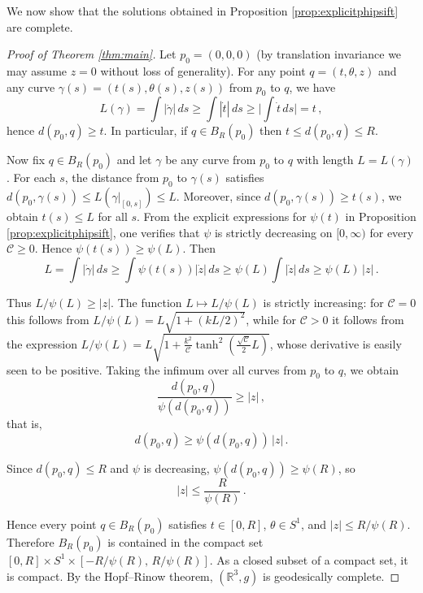 \documentclass[12pt,a4paper,reqno]{amsart}
\theoremstyle{plain}
\theoremstyle{remark}
\numberwithin{equation}{section}
\newcommand{\cC}{\mathcal{C}}
\newcommand{\R}{\mathbb{R}}
\begin{document}
We now show that the solutions obtained in Proposition \ref{prop:explicitphipsift} are complete.

\begin{proof}[Proof of Theorem \ref{thm:main}]
Let $p_0 = (0,0,0)$ (by translation invariance we may assume $z=0$ without loss of generality). For any point $q = (t,\theta,z)$ and any curve $\gamma(s) = (t(s),\theta(s),z(s))$ from $p_0$ to $q$, we have
\begin{equation*}
L(\gamma) = \int |\dot\gamma| \, ds \ge \int |\dot t| \, ds \ge \Big|\int \dot t \, ds\Big| = t \,,
\end{equation*}
hence $d(p_0,q) \ge t$. In particular, if $q \in B_R(p_0)$ then $t \le d(p_0,q) \le R$.

Now fix $q \in B_R(p_0)$ and let $\gamma$ be any curve from $p_0$ to $q$ with length $L = L(\gamma)$. 
For each $s$, the distance from $p_0$ to $\gamma(s)$ satisfies $d(p_0,\gamma(s)) \le L(\gamma|_{[0,s]}) \le L$. 
Moreover, since $d(p_0,\gamma(s)) \ge t(s)$, we obtain $t(s) \le L$ for all $s$. From the explicit expressions for $\psi(t)$ in Proposition \ref{prop:explicitphipsift}, one verifies that $\psi$ is strictly decreasing on $[0,\infty)$ for every $\cC\ge 0$. Hence $\psi(t(s)) \ge \psi(L)$. Then
\begin{equation*}
L = \int |\dot{\gamma}| \,ds \ge \int \psi(t(s))|\dot{z}| \,ds \ge \psi(L) \int |\dot{z}| \,ds \ge \psi(L) \,|z| \,.
\end{equation*}

Thus $L/\psi(L) \ge |z|$. The function $L \mapsto L/\psi(L)$ is strictly increasing: for $\cC=0$ this follows from $L/\psi(L)=L\sqrt{1+(kL/2)^2}$, while for $\cC>0$ it follows from the expression $L/\psi(L)=L\sqrt{1+\frac{k^2}{\cC}\tanh^2(\frac{\sqrt{\cC}}{2}L)}$, whose derivative is easily seen to be positive. Taking the infimum over all curves from $p_0$ to $q$, we obtain
\begin{equation*}
\frac{d(p_0,q)}{\psi(d(p_0,q))} \ge |z| \,,
\end{equation*}
that is,
\begin{equation*}
d(p_0,q) \ge \psi(d(p_0,q)) \,|z| \,.
\end{equation*}

Since $d(p_0,q) \le R$ and $\psi$ is decreasing, $\psi(d(p_0,q)) \ge \psi(R)$, so
\begin{equation*}
|z| \le \frac{R}{\psi(R)} \,.
\end{equation*}

Hence every point $q\in B_R(p_0)$ satisfies $t\in[0,R]$, $\theta\in S^1$, and $|z|\le R/\psi(R)$. Therefore $B_R(p_0)$ is contained in the compact set $[0,R]\times S^1\times[-R/\psi(R),\,R/\psi(R)]$. As a closed subset of a compact set, it is compact. By the Hopf–Rinow theorem, $(\R^3,g)$ is geodesically complete.
\end{proof}
\end{document}
